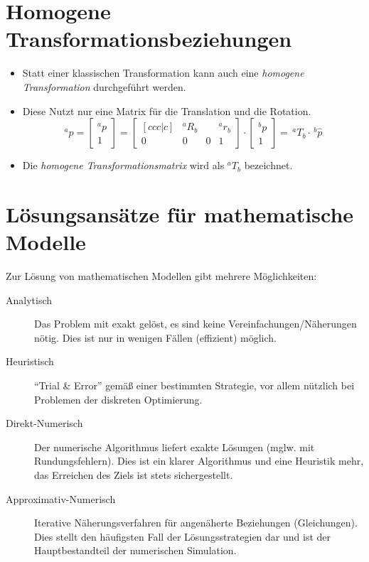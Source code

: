 \documentclass[a4paper, 11pt, accentcolor = tud3b]{tudreport}
\begin{document}
        \section{Homogene Transformationsbeziehungen} %
	        \label{sec:homogeneMatrix}
        
            \begin{itemize}
            	\item Statt einer klassischen Transformation kann auch eine \textit{homogene Transformation} durchgeführt werden.
            	\item Diese Nutzt nur eine Matrix für die Translation und die Rotation.
	            	\begin{equation*}
			            ^a\hat{p} =
			            \begin{bmatrix}
				            ^ap \\ \hline
				            1
			            \end{bmatrix}
			            =
			            \begin{bmatrix}[ccc|c]
				            & ^aR_b & & ^ar_b \\ \hline
				            0 & 0 & 0 & 1
			            \end{bmatrix}
			            \cdot
			            \begin{bmatrix}
				            ^bp \\ \hline
				            1
			            \end{bmatrix}
			            = \,^aT_b \cdot \,^b\hat{p}
	            	\end{equation*}
	            \item Die \textit{homogene Transformationsmatrix} wird als \( ^aT_b \) bezeichnet.
            \end{itemize}

        \section{Lösungsansätze für mathematische Modelle} %
            Zur Lösung von mathematischen Modellen gibt mehrere Möglichkeiten:
            \begin{description}
            	\item[Analytisch] Das Problem mit exakt gelöst, es sind keine Vereinfachungen/Näherungen nötig. Dies ist nur in wenigen Fällen (effizient) möglich.
            	\item[Heuristisch] \enquote{Trial \& Error} gemäß einer bestimmten Strategie, vor allem nützlich bei Problemen der diskreten Optimierung.
            	\item[Direkt-Numerisch] Der numerische Algorithmus liefert exakte Lösungen (mglw. mit Rundungsfehlern). Dies ist ein klarer Algorithmus und eine Heuristik mehr, das Erreichen des Ziels ist stets sichergestellt.
            	\item[Approximativ-Numerisch] Iterative Näherungsverfahren für angenäherte Beziehungen (Gleichungen). Dies stellt den häufigsten Fall der Lösungsstrategien dar und ist der Hauptbestandteil der numerischen Simulation.
            \end{description}
            
\end{document}
